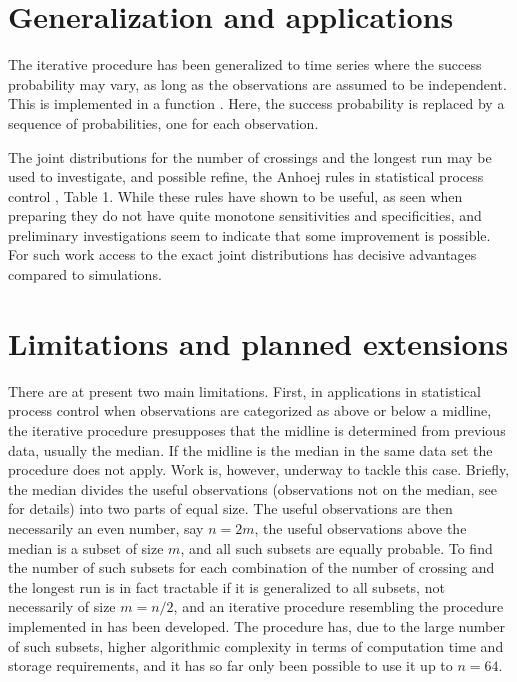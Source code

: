 \normalsize

\section{Generalization and applications}

The iterative procedure has been generalized to time series where the success probability may vary, as long as the observations are assumed to be independent. This is implemented in a function . Here, the success probability is replaced by a sequence of probabilities, one for each observation.

The joint distributions for the number of crossings and the longest run may be used to investigate, and possible refine, the Anhoej rules in statistical process control \citep{Anhoej:2014} , Table 1. While these rules have shown to be useful, as seen when preparing \citep{Anhoej:2018} they do not have quite monotone sensitivities and specificities, and preliminary investigations seem to indicate that some improvement is possible. For such work access to the exact joint distributions has decisive advantages compared to simulations. 

\section{Limitations and planned extensions}


There are at present two main limitations. First, in applications in statistical process control when observations are categorized as above or below a midline, the iterative procedure presupposes that the midline is determined from previous data, usually the median. If the midline is the median in the same data set the procedure does not apply. Work is, however, underway to tackle this case. Briefly, the median divides the useful observations (observations not on the median, see \citep{Anhoej:2014} for details) 
into two parts of equal size. The useful observations are then necessarily an even number, say $n=2m$,  the useful observations above the median is a subset of size $m$, and all such subsets are equally probable. To find the number of such subsets for each combination of the number of crossing and the longest run is in fact tractable if it is generalized to all subsets, not necessarily of size $m=n/2$, and an iterative procedure resembling the procedure implemented in  has been developed. The procedure has, due to the large number of such subsets, higher algorithmic complexity in terms of computation time and storage requirements, and it has so far only been possible to use it up to $n=64$.

